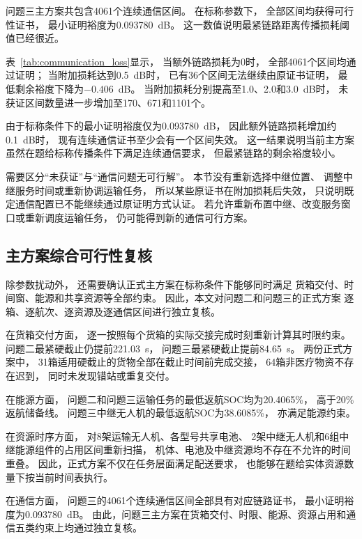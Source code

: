 问题三主方案共包含4061个连续通信区间。
在标称参数下，
全部区间均获得可行性证书，
最小证明裕度为0.093780~dB。
这一数值说明最紧链路距离传播损耗阈值已经很近。



表~\ref{tab:communication_loss}显示，
当额外链路损耗为0时，
全部4061个区间均通过证明；
当附加损耗达到0.5~dB时，
已有36个区间无法继续由原证书证明，
最低剩余裕度下降为$-0.406$~dB。
当附加损耗分别提高至1.0、2.0和3.0~dB时，
未获证区间数量进一步增加至170、671和1101个。

由于标称条件下的最小证明裕度仅为0.093780~dB，
因此额外链路损耗增加约0.1~dB时，
现有连续通信证书至少会有一个区间失效。
这一结果说明当前主方案虽然在题给标称传播条件下满足连续通信要求，
但最紧链路的剩余裕度较小。

需要区分``未获证''与``通信问题无可行解''。
本节没有重新选择中继位置、
调整中继服务时间或重新协调运输任务，
所以某些原证书在附加损耗后失效，
只说明既定通信配置已不能继续通过原证明方式认证。
若允许重新布置中继、改变服务窗口或重新调度运输任务，
仍可能得到新的通信可行方案。

\subsection{主方案综合可行性复核}

除参数扰动外，
还需要确认正式主方案在标称条件下能够同时满足
货箱交付、时间窗、能源和共享资源等全部约束。
因此，本文对问题二和问题三的正式方案
逐箱、逐航次、逐资源及逐通信区间进行独立复核。

在货箱交付方面，
逐一按照每个货箱的实际交接完成时刻重新计算其时限约束。
问题二最紧硬截止仍提前221.03~s，
问题三最紧硬截止提前84.65~s。
两份正式方案中，
31箱适用硬截止的货物全部在截止时间前完成交接，
64箱非医疗物资不存在迟到，
同时未发现错站或重复交付。

在能源方面，
问题二和问题三运输任务的最低返航SOC均为20.4065\%，
高于20\%返航储备线。
问题三中继无人机的最低返航SOC为38.6085\%，
亦满足能源约束。

在资源时序方面，
对8架运输无人机、各型号共享电池、
2架中继无人机和6组中继能源组件的占用区间重新扫描，
机体、电池及中继资源均不存在不允许的时间重叠。
因此，正式方案不仅在任务层面满足配送要求，
也能够在题给实体资源数量下按当前时间表执行。

在通信方面，
问题三的4061个连续通信区间全部具有对应链路证书，
最小证明裕度为0.093780~dB。
由此，问题三主方案在货箱交付、时限、能源、资源占用和通信五类约束上均通过独立复核。

